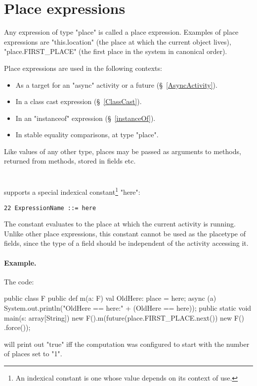 \cbend
\section{Place expressions}
Any expression of type \xcd"place" is called a place expression. 
Examples of place expressions are \xcd"this.location" (the place
at which the current object lives), \xcd"place.FIRST_PLACE"
(the first place in the system in canonical order). 

Place expressions are used in the following contexts: 
\begin{itemize}
\item As a target for an \xcd"async" activity or a future
(\S~\ref{AsyncActivity}).
\item In a class cast expression  (\S~\ref{ClassCast}).
\item In an \xcd"instanceof" expression (\S~\ref{instanceOf}).
\item In stable equality comparisons, at type \xcd"place".
\end{itemize}

Like values of any other type, places may be passed as arguments
to methods, returned from methods, stored in fields etc.

\section{}\label{Here}
\Xten{} supports a special indexical constant\footnote{
An indexical constant is one whose value depends on its context
of use.} \xcd"here":
\begin{verbatim}
22 ExpressionName ::= here
\end{verbatim}
The constant evaluates to the place at which the current activity is
running. Unlike other place expressions, this constant cannot be 
used as the placetype of fields, since the type of a field 
should be independent of the activity accessing it.

\paragraph{Example.}
The code:
\begin{xten}
public class F {
  public def m(a: F) {
    val OldHere: place = here;
    async (a) {
      System.out.println("OldHere == here:" 
                         + (OldHere == here));
    }
  }
  public static void main(s: array[String]) {
    new F().m(future(place.FIRST_PLACE.next())
              { new F() }.force());
  }
}  
\end{xten}
\noindent will print out \xcd"true" iff the computation was configured
to start with the number of places set to \xcd"1". 


